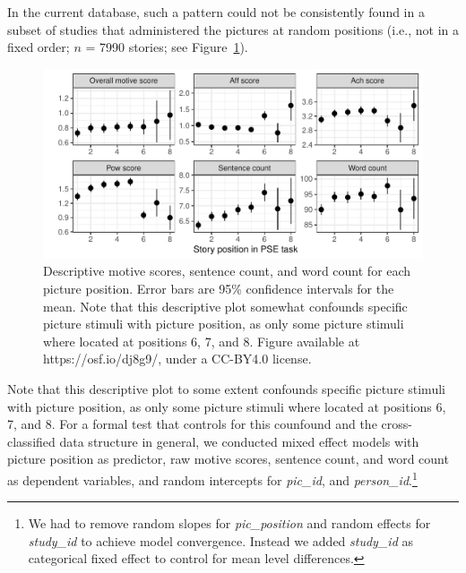 \documentclass[man,a4paper,mask]{apa6}\usepackage[]{graphicx}\usepackage[]{color}
\newenvironment{knitrout}{}{} %
\begin{document}
In the current database, such a pattern could not be consistently found in a subset of studies that administered the pictures at random positions (i.e., not in a fixed order; $n$ = 7990 stories; see Figure~\ref{fig:picPosPlot}). 

\begin{knitrout}
\color{fgcolor}\begin{figure}

{\centering \includegraphics[width=.9\textwidth]{figure/picPosPlot-1} 

}

\caption[Descriptive motive scores, sentence count, and word count for each picture position]{Descriptive motive scores, sentence count, and word count for each picture position. Error bars are 95\% confidence intervals for the mean. Note that this descriptive plot somewhat confounds specific picture stimuli with picture position, as only some picture stimuli where located at positions 6, 7, and 8. Figure available at https://osf.io/dj8g9/, under a CC-BY4.0 license.}\label{fig:picPosPlot}
\end{figure}


\end{knitrout}

Note that this descriptive plot to some extent confounds specific picture stimuli with picture position, as only some picture stimuli where located at positions 6, 7, and 8. For a formal test that controls for this counfound and the cross-classified data structure in general, we conducted mixed effect models with picture position as predictor, raw motive scores, sentence count, and word count as dependent variables, and random intercepts for \emph{pic\_id}, and \emph{person\_id}.\footnote{We had to remove random slopes for \emph{pic\_position} and random effects for \emph{study\_id} to achieve model convergence. Instead we added \emph{study\_id} as categorical fixed effect to control for mean level differences.} 
\end{document}
